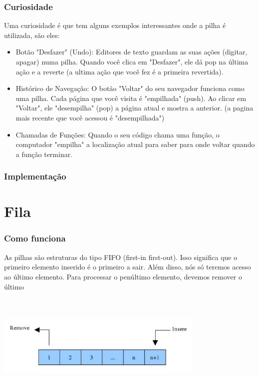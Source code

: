 \documentclass{report}
\begin{document}
	
	\subsubsection{Curiosidade}
	
	Uma curiosidade é que tem alguns exemplos interessantes onde a pilha é utilizada, são eles:
	
	\begin{itemize}
		\item Botão "Desfazer" (Undo): Editores de texto guardam as suas ações (digitar, apagar) numa pilha. Quando você clica em "Desfazer", ele dá pop na última ação e a reverte (a ultima ação que você fez é a primeira revertida).
		\item Histórico de Navegação: O botão "Voltar" do seu navegador funciona como uma pilha. Cada página que você visita é "empilhada" (push). Ao clicar em "Voltar", ele "desempilha" (pop) a página atual e mostra a anterior. (a pagina mais recente que você acessou é "desempilhada")
		\item Chamadas de Funções: Quando o seu código chama uma função, o computador "empilha" a localização atual para saber para onde voltar quando a função terminar.
	\end{itemize}
	
	
	
	\subsubsection{Implementação}
	
	\section{Fila}
	
	\subsubsection{Como funciona}
	
	As pilhas são estruturas do tipo FIFO (first-in first-out). Isso significa que o primeiro elemento inserido é o primeiro a sair. Além disso, nós só teremos acesso ao último elemento. Para processar o penúltimo elemento, devemos remover o último
	
			
	
	\begin{center}
		
		\includegraphics[width=10cm,height=5cm,keepaspectratio=false]{imagens/fila.png}
		
	\end{center}
	
\end{document}
